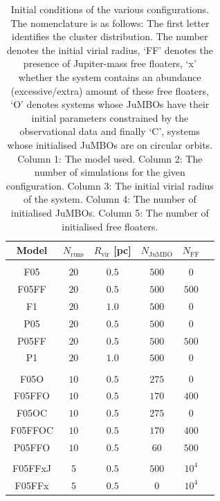 \documentclass[aa]{lib/aa}
\begin{document}
\begin{table}
  \caption{Initial conditions of the various configurations. The
    nomenclature is as follows: The first letter identifies the
    cluster distribution. The number denotes the initial virial
    radius, `FF' denotes the presence of Jupiter-mass free floaters,
    `x' whether the system contains an abundance (excessive/extra)
    amount of these free floaters, `O' denotes systems whose JuMBOs
    have their initial parameters constrained by the observational
    data and finally `C', systems whose initialised JuMBOs are on
    circular orbits. Column 1: The model used. Column 2: The number of
    simulations for the given configuration. Column 3: The initial
    virial radius of the system. Column 4: The number of initialised
    JuMBOs. Column 5: The number of initialised free floaters.}
        \label{Tab:SF_FF_Params}
        \centering 
        \begin{tabular}{c c c c c c}
        \hline\hline
        Model & $N_{\mathrm{runs}}$ & $R_{\mathrm{vir}}$ [pc] & $N_{\mathrm{JuMBO}}$ & $N_{\mathrm{FF}}$\\
        \hline \vspace{-0.75em}\\ 
           F05     & $20$ & $0.5$ & $500$ & $0$ \\
           F05FF   & $20$ & $0.5$ & $500$ & $500$ \\
           F1      & $20$ & $1.0$ & $500$ & $0$ \\
           P05     & $20$ & $0.5$ & $500$ & $0$ \\
           P05FF   & $20$ & $0.5$ & $500$ & $500$ \\
           P1      & $20$ & $1.0$ & $500$ & $0$ \\
           \hline
           \hline \vspace{-0.75em}\\
           F05O   & $10$ & $0.5$ & $275$ & $0$ \\
           F05FFO & $10$ & $0.5$ & $170$ & $400$ & \\
           F05OC   & $10$ & $0.5$ & $275$ & $0$ \\
           F05FFOC & $10$ & $0.5$ & $170$ & $400$ & \\
           P05FFO   & $10$ & $0.5$ & $60$  & $500$ \\
           \hline
           \hline \vspace{-0.75em}\\
           F05FFxJ & $5$ & $0.5$ & $500$ & $10^{4}$ \\
           F05FFx  & $5$ & $0.5$ & $0$   & $10^{4}$\\
         \hline                                   %
        \end{tabular}
     \end{table}
\end{document}
